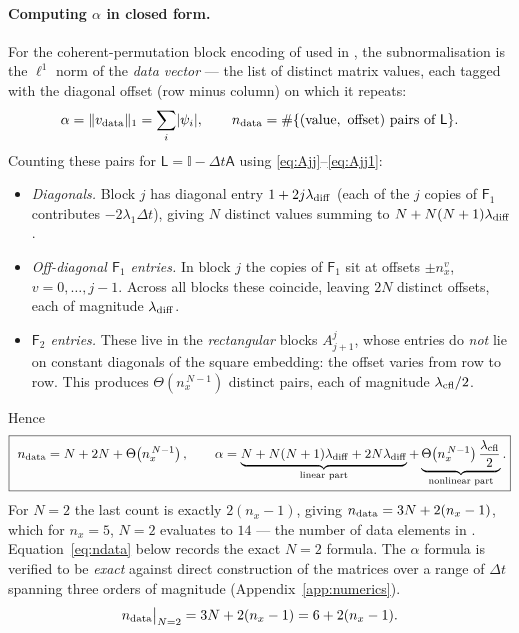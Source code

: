 \documentclass[11pt,a4paper]{article}
\theoremstyle{plain}
\theoremstyle{definition}
\theoremstyle{remark}
\newcommand{\norm}[1]{\lVert #1 \rVert}
\newcommand{\abs}[1]{\lvert #1 \rvert}
\newcommand{\Id}{\mathbb{I}}
\newcommand{\Lmat}{\mathsf{L}}
\newcommand{\Amat}{\mathsf{A}}
\newcommand{\Fone}{\mathsf{F}_1}
\newcommand{\Ftwo}{\mathsf{F}_2}
\begin{document}
\paragraph{Computing $\alpha$ in closed form.}  For the coherent-permutation
block encoding of \cite{Setty2025BE} used in \cite{Setty2026}, the
subnormalisation is the $\ell^1$ norm of the \emph{data vector} --- the list of
distinct matrix values, each tagged with the diagonal offset (row minus column)
on which it repeats:
\begin{equation}
\alpha=\norm{v_{\rm data}}_1=\sum_i\abs{\psi_i},
\qquad
n_{\rm data}=\#\{(\text{value},\ \text{offset})\ \text{pairs of }\Lmat\}.
\end{equation}
Counting these pairs for $\Lmat=\Id-\Delta t\Amat$ using
\eqref{eq:Ajj}--\eqref{eq:Ajj1}:
\begin{itemize}[nosep,leftmargin=*]
\item \emph{Diagonals.}  Block $j$ has diagonal entry $1+2j\lambda_{\rm diff}$
(each of the $j$ copies of $\Fone$ contributes $-2\lambda_1\Delta t$), giving $N$
distinct values summing to $N+N(N+1)\lambda_{\rm diff}$.
\item \emph{Off-diagonal $\Fone$ entries.}  In block $j$ the copies of $\Fone$
sit at offsets $\pm n_x^{v}$, $v=0,\dots,j-1$.  Across all blocks these coincide,
leaving $2N$ distinct offsets, each of magnitude $\lambda_{\rm diff}$.
\item \emph{$\Ftwo$ entries.}  These live in the \emph{rectangular} blocks
$A^j_{j+1}$, whose entries do \emph{not} lie on constant diagonals of the square
embedding: the offset varies from row to row.  This produces
$\Theta(n_x^{\,N-1})$ distinct pairs, each of magnitude $\lambda_{\rm cfl}/2$.
\end{itemize}
Hence
\begin{equation}
\boxed{\
n_{\rm data}=N+2N+\Theta\!\left(n_x^{\,N-1}\right),
\qquad
\alpha=\underbrace{N+N(N+1)\lambda_{\rm diff}+2N\lambda_{\rm diff}}_{\text{linear part}}
+\underbrace{\Theta\!\left(n_x^{\,N-1}\right)\frac{\lambda_{\rm cfl}}{2}}_{\text{nonlinear part}} .}
\label{eq:alpha}
\end{equation}
For $N=2$ the last count is exactly $2(n_x-1)$, giving
$n_{\rm data}=3N+2(n_x-1)$, which for $n_x=5$, $N=2$ evaluates to $14$ --- the
number of data elements in \cite[Table~3]{Setty2026}.
Equation~\eqref{eq:ndata} below records the exact $N=2$ formula.  The $\alpha$
formula is verified to be \emph{exact} against direct construction of the
matrices over a range of $\Delta t$ spanning three orders of magnitude
(Appendix~\ref{app:numerics}).
\begin{equation}
n_{\rm data}\big|_{N=2}=3N+2(n_x-1)=6+2(n_x-1).
\label{eq:ndata}
\end{equation}
\end{document}
